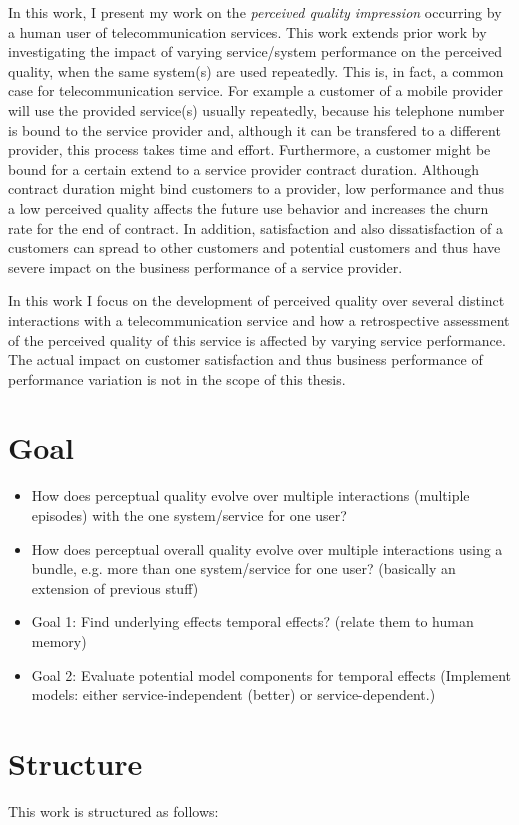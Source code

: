 In this work, I present my work on the \emph{perceived quality impression} occurring by a human user of telecommunication services.
This work extends prior work by investigating the impact of varying service/system performance on the perceived quality, when the same system(s) are used repeatedly.
This is, in fact, a common case for telecommunication service.
For example a customer of a mobile  provider will use the provided service(s) usually repeatedly, because his telephone number is bound to the service provider and, although it can be transfered to a different provider, this process takes time and effort.
Furthermore, a customer might be bound for a certain extend to a service provider contract duration.
Although contract duration might bind customers to a provider, low performance and thus a low perceived quality affects the future use behavior and increases the churn rate for the end of contract.
In addition, satisfaction and also dissatisfaction of a customers can spread to other customers and potential customers and thus have severe impact on the business performance of a service provider.

In this work I focus on the development of perceived quality over several distinct interactions with a telecommunication service and how a retrospective assessment of the perceived quality of this service is affected by varying service performance.
The actual impact on customer satisfaction and thus business performance of performance variation is not in the scope of this thesis.

\section{Goal}
\begin{itemize}
\item How does perceptual quality evolve over multiple interactions (multiple episodes) with the one system/service for one user?
\item How does perceptual overall quality evolve over multiple interactions using a bundle, e.g. more than one system/service for one user? (basically an extension of previous stuff)
\end{itemize}

\begin{itemize}
\item Goal 1: Find underlying effects temporal effects? (relate them to human memory)
\item Goal 2: Evaluate potential model components for temporal effects (Implement models: either service-independent (better) or service-dependent.)
\end{itemize}

\section{Structure}
This work is structured as follows: